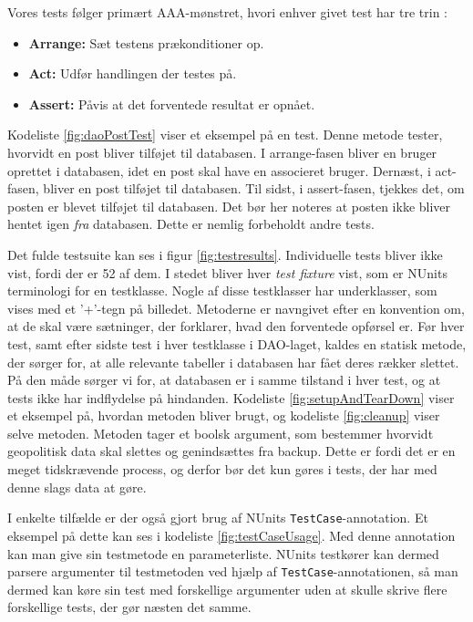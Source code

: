 Vores tests følger primært AAA-mønstret, hvori enhver givet test har tre trin \cite{ArrangeActAssert}:
\begin{itemize}
    \item \textbf{Arrange:} Sæt testens prækonditioner op.
    \item \textbf{Act:} Udfør handlingen der testes på.
    \item \textbf{Assert:} Påvis at det forventede resultat er opnået.
\end{itemize}
Kodeliste \ref{fig:daoPostTest} viser et eksempel på en test. Denne metode tester, hvorvidt en post bliver tilføjet til databasen. I arrange-fasen bliver en bruger oprettet i databasen, idet en post skal have en associeret bruger. Dernæst, i act-fasen, bliver en post tilføjet til databasen. Til sidst, i assert-fasen, tjekkes det, om posten er blevet tilføjet til databasen. Det bør her noteres at posten ikke bliver hentet igen \textit{fra} databasen. Dette er nemlig forbeholdt andre tests.

Det fulde testsuite kan ses i figur \ref{fig:testresults}. Individuelle tests bliver ikke vist, fordi der er 52 af dem. I stedet bliver hver \textit{test fixture} vist, som er NUnits terminologi for en testklasse. Nogle af disse testklasser har underklasser, som vises med et '+'-tegn på billedet. Metoderne er navngivet efter en konvention om, at de skal være sætninger, der forklarer, hvad den forventede opførsel er. Før hver test, samt efter sidste test i hver testklasse i DAO-laget, kaldes en statisk metode, der sørger for, at alle relevante tabeller i databasen har fået deres rækker slettet. På den måde sørger vi for, at databasen er i samme tilstand i hver test, og at tests ikke har indflydelse på hindanden. Kodeliste \ref{fig:setupAndTearDown} viser et eksempel på, hvordan metoden bliver brugt, og kodeliste \ref{fig:cleanup} viser selve metoden. Metoden tager et boolsk argument, som bestemmer hvorvidt geopolitisk data skal slettes og genindsættes fra backup. Dette er fordi det er en meget tidskrævende process, og derfor bør det kun gøres i tests, der har med denne slags data at gøre.

I enkelte tilfælde er der også gjort brug af NUnits \texttt{TestCase}-annotation. Et eksempel på dette kan ses i kodeliste \ref{fig:testCaseUsage}. Med denne annotation kan man give sin testmetode en parameterliste. NUnits testkører kan dermed parsere argumenter til testmetoden ved hjælp af \texttt{TestCase}-annotationen, så man dermed kan køre sin test med forskellige argumenter uden at skulle skrive flere forskellige tests, der gør næsten det samme.

